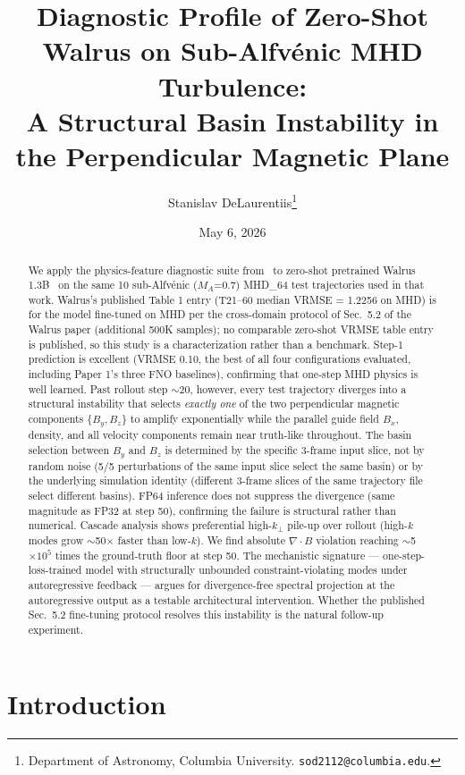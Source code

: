 \documentclass{article}
\title{Diagnostic Profile of Zero-Shot Walrus on Sub-Alfv\'enic MHD Turbulence:\\
A Structural Basin Instability in the Perpendicular Magnetic Plane}
\author{%
  Stanislav DeLaurentiis\thanks{Department of Astronomy, Columbia University. \texttt{sod2112@columbia.edu}.} \\
}
\date{May 6, 2026}
\begin{document}
\maketitle

\begin{abstract}
We apply the physics-feature diagnostic suite from~\cite{delaurentiis2026paper1} to zero-shot pretrained Walrus 1.3B~\cite{mccabe2025walrus} on the same 10 sub-Alfv\'enic ($M_A$=0.7) MHD\_64 test trajectories used in that work. Walrus's published Table 1 entry (T21--60 median VRMSE = 1.2256 on MHD) is for the model fine-tuned on MHD per the cross-domain protocol of Sec.~5.2 of the Walrus paper (additional 500K samples); no comparable zero-shot VRMSE table entry is published, so this study is a characterization rather than a benchmark. Step-1 prediction is excellent (VRMSE 0.10, the best of all four configurations evaluated, including Paper 1's three FNO baselines), confirming that one-step MHD physics is well learned. Past rollout step $\sim$20, however, every test trajectory diverges into a structural instability that selects \emph{exactly one} of the two perpendicular magnetic components $\{B_y, B_z\}$ to amplify exponentially while the parallel guide field $B_x$, density, and all velocity components remain near truth-like throughout. The basin selection between $B_y$ and $B_z$ is determined by the specific 3-frame input slice, not by random noise (5/5 perturbations of the same input slice select the same basin) or by the underlying simulation identity (different 3-frame slices of the same trajectory file select different basins). FP64 inference does not suppress the divergence (same magnitude as FP32 at step 50), confirming the failure is structural rather than numerical. Cascade analysis shows preferential high-$k_\perp$ pile-up over rollout (high-$k$ modes grow $\sim$50$\times$ faster than low-$k$). We find absolute $\nabla\cdot B$ violation reaching $\sim$5$\times 10^5$ times the ground-truth floor at step 50. The mechanistic signature --- one-step-loss-trained model with structurally unbounded constraint-violating modes under autoregressive feedback --- argues for divergence-free spectral projection at the autoregressive output as a testable architectural intervention. Whether the published Sec.~5.2 fine-tuning protocol resolves this instability is the natural follow-up experiment.
\end{abstract}

\section{Introduction}
\end{document}
